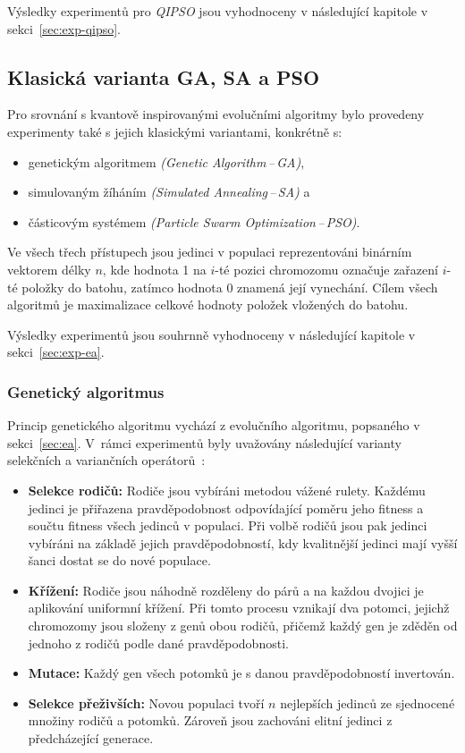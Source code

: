 Výsledky experimentů pro \emph{QIPSO} jsou vyhodnoceny v následující kapitole v sekci~\ref{sec:exp-qipso}.

\newpage
\subsection*{Klasická varianta GA, SA a PSO}
Pro srovnání s kvantově inspirovanými evolučními algoritmy bylo provedeny experimenty také s jejich klasickými variantami, konkrétně s:
\begin{itemize}
    \item genetickým algoritmem \emph{(Genetic Algorithm\,--\,GA)},
    \item simulovaným žíháním \emph{(Simulated Annealing\,--\,SA)} a
    \item částicovým systémem \emph{(Particle Swarm Optimization\,--\,PSO)}.
\end{itemize}
Ve všech třech přístupech jsou jedinci v populaci reprezentováni binárním vektorem délky $n$, kde hodnota 1 na $i$-té pozici chromozomu označuje zařazení $i$-té položky do batohu, zatímco hodnota 0 znamená její vynechání. 
Cílem všech algoritmů je maximalizace celkové hodnoty položek vložených do batohu.

Výsledky experimentů jsou souhrnně vyhodnoceny v následující kapitole v sekci~\ref{sec:exp-ea}.

\subsubsection*{Genetický algoritmus}
Princip genetického algoritmu vychází z evolučního algoritmu, popsaného v sekci~\ref{sec:ea}. 
V~rám\-ci experimentů byly uvažovány následující varianty selekčních a variančních operátorů~\cite{ga-app}: 
\begin{itemize}
    \item \textbf{Selekce rodičů:} Rodiče jsou vybíráni metodou vážené rulety. 
        Každému jedinci je přiřazena pravděpodobnost odpovídající poměru jeho fitness a součtu fitness všech jedinců v populaci. 
        Při volbě rodičů jsou pak jedinci vybíráni na základě jejich pravděpodobností, kdy kvalitnější jedinci mají vyšší šanci dostat se do nové populace. 
    \item \textbf{Křížení:} Rodiče jsou náhodně rozděleny do párů a na každou dvojici je aplikování uniformní křížení. 
        Při tomto procesu vznikají dva potomci, jejichž chromozomy jsou složeny z genů obou rodičů, přičemž každý gen je zděděn od jednoho z rodičů podle dané pravděpodobnosti.
    \item \textbf{Mutace:} Každý gen všech potomků je s danou pravděpodobností invertován.
    \item \textbf{Selekce přeživších:} Novou populaci tvoří $n$ nejlepších jedinců ze sjednocené množiny rodičů a potomků. 
        Zároveň jsou zachováni elitní jedinci z předcházející generace. 
\end{itemize}

